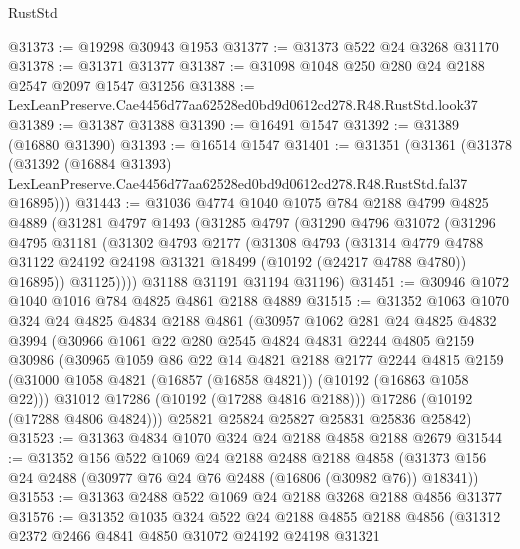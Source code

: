 \begin{lexlean}{RustStd}
\begin{coremodule}
@31373 := @19298 @30943 @1953
@31377 := @31373 @522 @24 @3268 @31170
@31378 := @31371 @31377
@31387 := @31098 @1048 @250 @280 @24 @2188 @2547 @2097 @1547 @31256
@31388 := LexLeanPreserve.Cae4456d77aa62528ed0bd9d0612cd278.R48.RustStd.look37
@31389 := @31387 @31388
@31390 := @16491 @1547
@31392 := @31389 (@16880 @31390)
@31393 := @16514 @1547
@31401 := @31351
    (@31361
      (@31378
        (@31392
          (@16884 @31393)
          LexLeanPreserve.Cae4456d77aa62528ed0bd9d0612cd278.R48.RustStd.fal37
          @16895)))
@31443 := @31036
    @4774
    @1040
    @1075
    @784
    @2188
    @4799
    @4825
    @4889
    (@31281
      @4797
      @1493
      (@31285
        @4797
        (@31290
          @4796
          @31072
          (@31296
            @4795
            @31181
            (@31302
              @4793
              @2177
              (@31308
                @4793
                (@31314
                  @4779
                  @4788
                  @31122
                  @24192
                  @24198
                  @31321
                  @18499
                  (@10192 (@24217 @4788 @4780))
                  @16895))
              @31125))))
      @31188
      @31191
      @31194
      @31196)
@31451 := @30946 @1072 @1040 @1016 @784 @4825 @4861 @2188 @4889
@31515 := @31352
    @1063
    @1070
    @324
    @24
    @4825
    @4834
    @2188
    @4861
    (@30957
      @1062
      @281
      @24
      @4825
      @4832
      @3994
      (@30966
        @1061
        @22
        @280
        @2545
        @4824
        @4831
        @2244
        @4805
        @2159
        @30986
        (@30965
          @1059
          @86
          @22
          @14
          @4821
          @2188
          @2177
          @2244
          @4815
          @2159
          (@31000 @1058 @4821 (@16857 (@16858 @4821)) (@10192 (@16863 @1058 @22)))
          @31012
          @17286
          (@10192 (@17288 @4816 @2188)))
        @17286
        (@10192 (@17288 @4806 @4824)))
      @25821
      @25824
      @25827
      @25831
      @25836
      @25842)
@31523 := @31363 @4834 @1070 @324 @24 @2188 @4858 @2188 @2679
@31544 := @31352
    @156
    @522
    @1069
    @24
    @2188
    @2488
    @2188
    @4858
    (@31373 @156 @24 @2488 (@30977 @76 @24 @76 @2488 (@16806 (@30982 @76)) @18341))
@31553 := @31363 @2488 @522 @1069 @24 @2188 @3268 @2188 @4856 @31377
@31576 := @31352
    @1035
    @324
    @522
    @24
    @2188
    @4855
    @2188
    @4856
    (@31312
      @2372
      @2466
      @4841
      @4850
      @31072
      @24192
      @24198
      @31321

\end{coremodule}
\end{lexlean}
